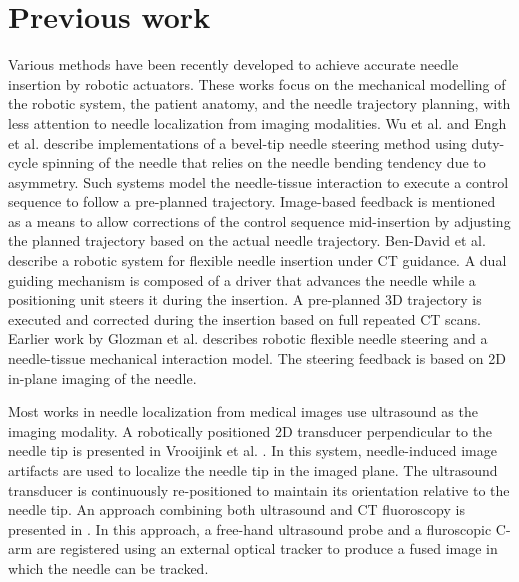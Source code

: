 \section*{Previous work}
Various methods have been recently developed to achieve accurate needle insertion by robotic actuators. These works focus on the mechanical modelling of the robotic system, the patient anatomy, and the needle trajectory planning, with less attention to needle localization from imaging modalities.
Wu et al. \cite{wu2013automatic} and Engh et al. \cite{engh2010percutaneous} describe implementations of a bevel-tip needle steering method using duty-cycle spinning of the needle that relies on the needle bending tendency due to asymmetry. Such systems model the needle-tissue interaction to execute a control sequence to follow a pre-planned trajectory. Image-based feedback is mentioned as a means to allow corrections of the control sequence mid-insertion by adjusting the planned trajectory based on the actual needle trajectory.
Ben-David et al. \cite{ben2018robotic} describe a robotic system for flexible needle insertion under CT guidance. A dual guiding mechanism is composed of a driver that advances the needle while a positioning unit steers it during the insertion. A pre-planned 3D trajectory is executed and corrected during the insertion based on full repeated CT scans.
Earlier work by Glozman et al. \cite{glozman2007image} describes robotic flexible needle steering and a needle-tissue mechanical interaction model. The steering feedback is based on 2D in-plane imaging of the needle.

Most works in needle localization from medical images use ultrasound as the imaging modality. A robotically positioned 2D transducer perpendicular to the needle tip is presented in Vrooijink et al. \cite{vrooijink2013real}. In this system, needle-induced image artifacts are used to localize the needle tip in the imaged plane. The ultrasound transducer is continuously re-positioned to maintain its orientation relative to the needle tip. An approach combining both ultrasound and CT fluoroscopy is presented in \cite{marinetto2017integration}. In this approach, a free-hand ultrasound probe and a fluroscopic C-arm are registered using an external optical tracker to produce a fused image in which the needle can be tracked.

